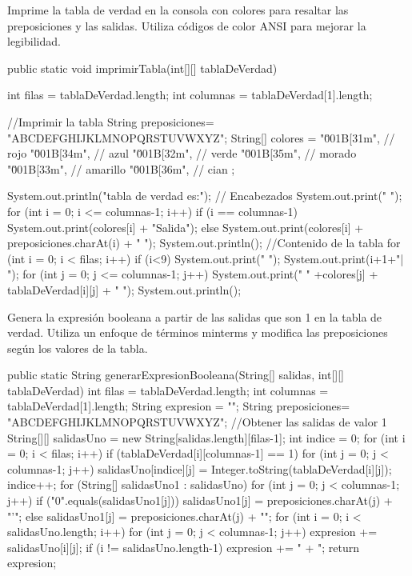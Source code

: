 \documentclass{IEEEcsmag}
\begin{document}
Imprime la tabla de verdad en la consola con colores para resaltar las preposiciones y las salidas. Utiliza códigos de color ANSI para mejorar la legibilidad.
\begin{javaCode}
public static void imprimirTabla(int[][] tablaDeVerdad){
    int filas = tablaDeVerdad.length;
    int columnas = tablaDeVerdad[1].length;
    
    //Imprimir la tabla
    String preposiciones= "ABCDEFGHIJKLMNOPQRSTUVWXYZ";
    String[] colores = {
        "\u001B[31m", // rojo
        "\u001B[34m", // azul
        "\u001B[32m", // verde
        "\u001B[35m", // morado
        "\u001B[33m", // amarillo
        "\u001B[36m", // cian
    };
    
    System.out.println("\nLa tabla de verdad es:");
    // Encabezados
    System.out.print("     ");
    for (int i = 0; i <= columnas-1; i++) {
        if (i == columnas-1) {
            System.out.print(colores[i] + "Salida");
        }else{
            System.out.print(colores[i] + preposiciones.charAt(i) + "  ");
        }
    }
    System.out.println();
    //Contenido de la tabla
    for (int i = 0; i < filas; i++) {
        if (i<9) {
            System.out.print(" ");
        }
        System.out.print(i+1+"| ");
        for (int j = 0; j <= columnas-1; j++) {
            System.out.print(" " +colores[j] + tablaDeVerdad[i][j] + " ");
        }
        System.out.println();
    }
}
\end{javaCode}
\newpage
Genera la expresión booleana a partir de las salidas que son 1 en la tabla de verdad. Utiliza un enfoque de términos minterms y modifica las preposiciones según los valores de la tabla.
\begin{javaCode}
public static String generarExpresionBooleana(String[] salidas, int[][] tablaDeVerdad){
    int filas = tablaDeVerdad.length;
    int columnas = tablaDeVerdad[1].length;
    String expresion = "";
    String preposiciones= "ABCDEFGHIJKLMNOPQRSTUVWXYZ";
    //Obtener las salidas de valor 1
    String[][] salidasUno = new String[salidas.length][filas-1];
    int indice = 0;
    for (int i = 0; i < filas; i++) {
        if (tablaDeVerdad[i][columnas-1] == 1) {
            for (int j = 0; j < columnas-1; j++) {
                salidasUno[indice][j] = 
                Integer.toString(tablaDeVerdad[i][j]);
            }
            indice++;
        }
    }
    for (String[] salidasUno1 : salidasUno) {
        for (int j = 0; j < columnas-1; j++) {
            if ("0".equals(salidasUno1[j])) {
                salidasUno1[j] = preposiciones.charAt(j) + "'";
            } else {
                salidasUno1[j] = preposiciones.charAt(j) + "";
            }
        }
    }
    for (int i = 0; i < salidasUno.length; i++) {
        for (int j = 0; j < columnas-1; j++) {
            expresion += salidasUno[i][j];
        }
        if (i != salidasUno.length-1) {
            expresion += " + ";
        }
    }
    return expresion;
}
\end{javaCode}
\end{document}
